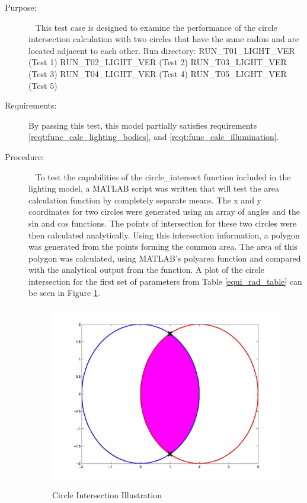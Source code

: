 \label{test:ident_cir}
\begin{description}
\item[Purpose:] \ \newline
This test case is designed to examine the performance of the circle
intersection calculation with two circles that have the same radius
and are located adjacent to each other.
\newline
Run directory: RUN\_T01\_LIGHT\_VER (Test 1)\newline
               RUN\_T02\_LIGHT\_VER (Test 2)\newline
               RUN\_T03\_LIGHT\_VER (Test 3)\newline
               RUN\_T04\_LIGHT\_VER (Test 4)\newline
               RUN\_T05\_LIGHT\_VER (Test 5)\newline
\item[Requirements:]%
By passing this test, this model partially satisfies requirements
\mbox{\ref{reqt:func_calc_lighting_bodies}}, and
\mbox{\ref{reqt:func_calc_illumination}}.

\item[Procedure:]\ \newline
To test the capabilities of the circle\_intersect function included in
the lighting model, a MATLAB script was written that will test the area
calculation function by completely separate means.  The x and y coordinates
for two circles were generated using an array of angles and the sin and cos
functions.  The points of intersection for these two circles were then
calculated analytically.  Using this intersection information, a polygon was
generated from the points forming the common area.  The area of this polygon
was calculated, using MATLAB's polyarea function and compared with the
analytical output from the function.  A plot of the circle intersection for
the first set of parameters from Table \ref{equi_rad_table} can be seen in
Figure \ref{cool_circle_plot}.

\begin{figure}[H]
\begin{center}
\includegraphics[height=80mm]{pics/circle_area1.jpg}
\caption{Circle Intersection Illustration}
\label{cool_circle_plot}
\end{center}
\end{figure}


\end{description}
